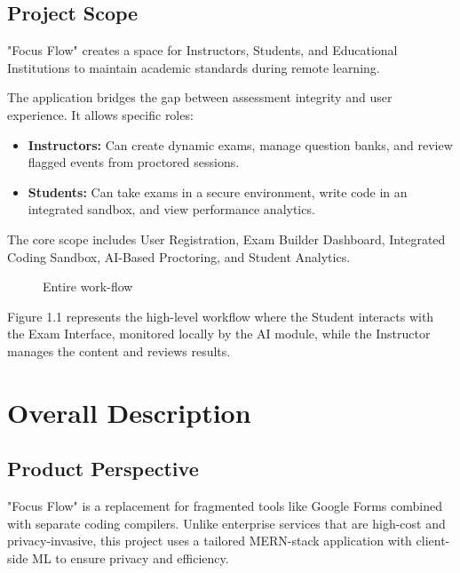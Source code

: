 \documentclass{scrreprt}
\begin{document}
\section{Project Scope}
"Focus Flow" creates a space for Instructors, Students, and Educational Institutions to maintain academic standards during remote learning.

The application bridges the gap between assessment integrity and user experience. It allows specific roles:
\begin{itemize}
    \item \textbf{Instructors:} Can create dynamic exams, manage question banks, and review flagged events from proctored sessions.
    \item \textbf{Students:} Can take exams in a secure environment, write code in an integrated sandbox, and view performance analytics.
\end{itemize}
The core scope includes User Registration, Exam Builder Dashboard, Integrated Coding Sandbox, AI-Based Proctoring, and Student Analytics.

\begin{figure}[htbp]
  \centering
  \caption{Entire work-flow}
  \label{fig:FocusFlowWorkFlow}
\end{figure}

Figure 1.1 represents the high-level workflow where the Student interacts with the Exam Interface, monitored locally by the AI module, while the Instructor manages the content and reviews results.

\chapter{Overall Description}

\section{Product Perspective}
"Focus Flow" is a replacement for fragmented tools like Google Forms combined with separate coding compilers. Unlike enterprise services that are high-cost and privacy-invasive, this project uses a tailored MERN-stack application with client-side ML to ensure privacy and efficiency.
\end{document}
